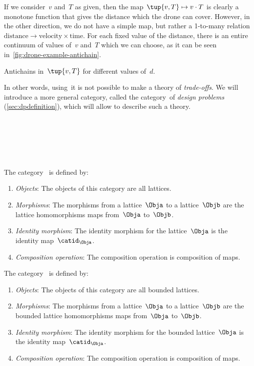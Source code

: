 {\begin{example}
		If we consider~$v$ and~$T$ as given, then the map~$\tup{v,T} \mapsto v\cdot T$ is clearly a monotone function that gives the distance which the drone can cover.
		However, in the other direction, we do not have a simple map, but rather a 1-to-many relation $\mathrm{distance}\to \mathrm{velocity}\times \mathrm{time}$.
		For each fixed value of the distance, there is an entire continuum of values of~$v$ and~$T$ which we can choose, as it can be seen in~\cref{fig:drone-example-antichain}.

		\begin{marginfigure}
			\centering
			\caption{Antichains in~$\tup{v,T}$ for different values of~$d$.}
			\label{fig:drone-example-antichain}
		\end{marginfigure}

	\end{example}

	In other words, using~\Pos it is not possible to make a theory of \emph{trade-offs}.
	We will introduce a more general category, called the category~\DP of \emph{design problems} (\cref{sec:dpdefinition}), which will allow to describe such a theory.

}

\

\

\

\begin{ctdefinition}
	\label{def:Lat}
	The category~\iindex{\Lat} is defined by:
	\begin{enumerate}
		\item \emph{Objects}: The objects of this category are all lattices.
		\item \emph{Morphisms}: The morphisms from a lattice~$\Obja$ to a lattice~$\Objb$ are the lattice homomorphisms maps from~$\Obja$ to~$\Objb$.
		\item \emph{Identity morphism}: The identity morphism for the lattice~$\Obja$
		      is the identity map~$\catid_\Obja$.
		\item \emph{Composition operation}: The composition operation is composition of maps.
	\end{enumerate}
\end{ctdefinition}

\begin{ctdefinition}
	\label{def:BoundedLat}
	The category~\iindex{\BoundedLat} is defined by:
	\begin{enumerate}
		\item \emph{Objects}: The objects of this category are all bounded lattices.
		\item \emph{Morphisms}: The morphisms from a lattice~$\Obja$ to a lattice~$\Objb$ are the bounded lattice homomorphisms maps from~$\Obja$ to~$\Objb$.
		\item \emph{Identity morphism}: The identity morphism for the bounded lattice~$\Obja$
		      is the identity map~$\catid_\Obja$.
		\item \emph{Composition operation}: The composition operation is composition of maps.
	\end{enumerate}
\end{ctdefinition}

